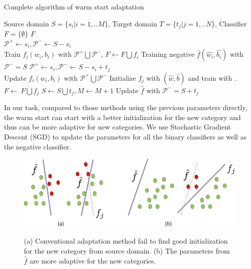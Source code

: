 \begin{algorithm}
  \caption{Complete algorithm of warm start adaptation}\label{algo:ws}
  \begin{algorithmic}[1]
    \REQUIRE Source domain $S = \{ {s_i}|i = 1,..M\} $, Target domain $T = \{ {t_j}|j = 1,..N\} $, Classifier $F = \{\emptyset\}$
    \ENSURE $F$\\
         \STATE $\mathcal{P^+}\leftarrow s_i, \mathcal{P^-}\leftarrow S-s_i$\\
          Train ${{f_i}\left( {{w_i},{b_i}} \right)}$ with $\mathcal{P^+}\bigcup\mathcal{P^-}$, $F\leftarrow F\bigcup f_i$
    \ENDFOR
    \STATE Training negative $\hat{f}\left( {\hat{w_i},\hat{b_i}} \right)$ with $\mathcal{P^-}=S$
             \STATE $\mathcal{P^+}\leftarrow s_i, \mathcal{P^-}\leftarrow S-s_i+t_j$ \\
              Update ${{f_i}\left( {{w_i},{b_i}} \right)}$ with $\mathcal{P^+}\bigcup\mathcal{P^-}$
        \ENDFOR
        \STATE Initialize $f_j$ with $(\hat{w},\hat{b})$ and train with .
        \STATE $F\leftarrow\ F\bigcup f_j$
        \STATE $S\leftarrow S\bigcup t_j, M\leftarrow M+1$
        \STATE Update $\hat{f}$ with $\mathcal{P^-}=S+t_j$
     \ENDWHILE
  \end{algorithmic}
\end{algorithm}
In our task, compared to those methods using the previous parameters directly, the warm start can start with a better initialization for the new category and thus can be more adaptive for new categories. We use Stochastic Gradient Descent (SGD) to update the parameters for all the binary classifiers as well as the negative classifier.
\begin{figure}
  \centering
  \includegraphics[scale = .6]{fig/domain.jpg}\\
  \caption{(a) Conventional adaptation method fail to find good initialization for the new category from source domain. (b) The parameters from $\hat{f}$ are more adaptive for the new categories.}
  \label{fig:wm}
\end{figure}

